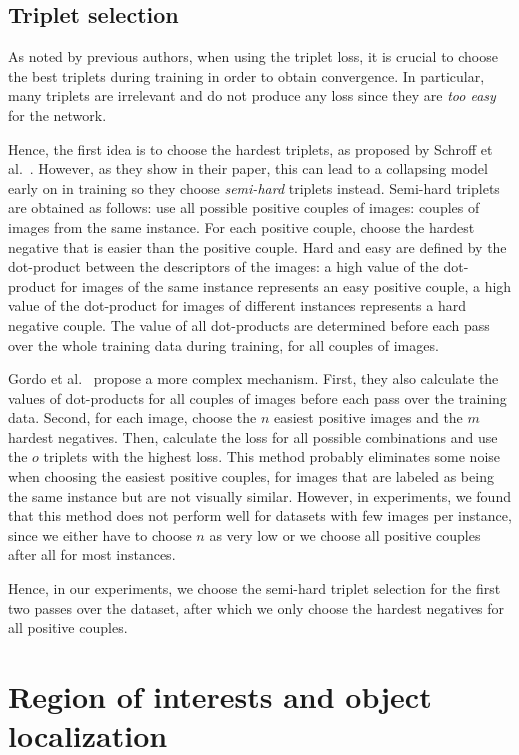 \subsection{Triplet selection}
As noted by previous authors, when using the triplet loss, it is
crucial to choose the best triplets during training in order to
obtain convergence. In particular, many triplets are irrelevant
and do not produce any loss since they are \emph{too easy} for the network.

Hence, the first idea is to choose the hardest triplets, as proposed by
Schroff et al.~\cite{schroff_facenet:_2015}. However, as they show in
their paper, this can lead to a collapsing model early on in training
so they choose  \emph{semi-hard} triplets instead. Semi-hard triplets
are obtained as follows:
use all possible positive couples of images: couples of images from the
same instance. For each positive couple, choose the hardest negative
that is easier than the positive couple. Hard and easy are defined
by the dot-product between the descriptors of the images: a high value
of the dot-product for images of the same instance represents an easy
positive couple, a high value of the dot-product for images of different
instances represents a hard negative couple.
The value of all dot-products are determined before each pass over
the whole training data during training, for all couples of images.

Gordo et al.~\cite{gordo_end--end_2016} propose a more complex mechanism.
First, they also calculate the values of dot-products for all couples of
images before each pass over the training data.
Second, for each image, choose the $n$ easiest positive images and the
$m$ hardest negatives. Then, calculate the loss for all possible combinations
and use the $o$ triplets with the highest loss.
This method probably eliminates some noise when choosing the easiest
positive couples, for images that are labeled as being the same instance
but are not visually similar.
However, in experiments, we found that this method does not perform well
for datasets with few images per instance, since we either have to
choose $n$ as very low or we choose all positive couples after all for
most instances.

Hence, in our experiments, we choose the semi-hard triplet selection
for the first two passes over the dataset, after which we only choose
the hardest negatives for all positive couples.

\section{Region of interests and object localization}\label{sec:analysisprev}
